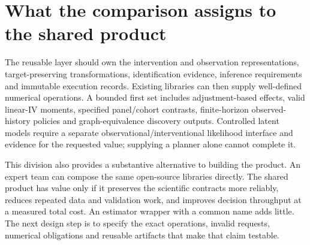 \section{What the comparison assigns to the shared product}
\label{r3:software-composition}

The reusable layer should own the intervention and observation
representations, target-preserving transformations, identification evidence,
inference requirements and immutable execution records. Existing libraries
can then supply well-defined numerical operations. A bounded first set
includes adjustment-based effects, valid linear-IV moments, specified
panel/cohort contrasts, finite-horizon observed-history policies and
graph-equivalence discovery outputs. Controlled latent models require a
separate observational/interventional likelihood interface and evidence
for the requested value; supplying a planner alone cannot complete it.

This division also provides a substantive alternative to building the
product. An expert team can compose the same open-source libraries directly.
The shared product has value only if it preserves the scientific contracts
more reliably, reduces repeated data and validation work, and improves
decision throughput at a measured total cost. An estimator wrapper with
a common name adds little. The next design step is to specify the exact
operations, invalid requests, numerical obligations and reusable artifacts
that make that claim testable.
